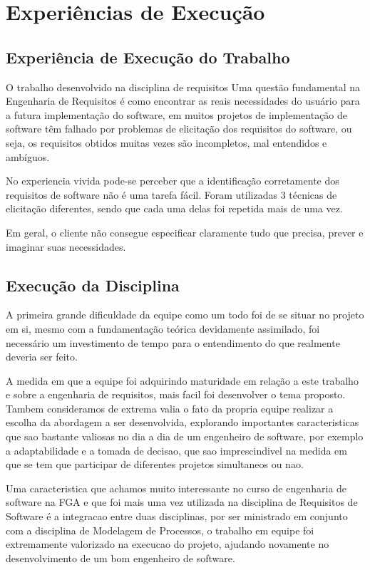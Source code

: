 \chapter[Experiências de Execução]{Experiências de Execução}

\section{Experiência de Execução do Trabalho}

O trabalho desenvolvido na disciplina de requisitos 
Uma questão fundamental na Engenharia de Requisitos é como encontrar as reais necessidades do usuário para a futura implementação do software, em muitos projetos de implementação de software têm falhado por problemas de elicitação dos requisitos do software, ou seja, os requisitos obtidos muitas vezes são incompletos, mal entendidos e ambíguos. 

No experiencia vivida pode-se perceber que a  identificação corretamente dos requisitos de software não é uma tarefa fácil. Foram utilizadas 3 técnicas de elicitação diferentes, sendo que cada uma delas foi repetida mais de uma vez.

Em geral, o cliente não consegue especificar claramente tudo que precisa, prever e imaginar suas necessidades.

\section{Execução da Disciplina}

A primeira grande dificuldade da equipe como um todo foi de se situar no projeto em si,
mesmo com a fundamentação teórica devidamente assimilado, foi necessário um investimento
de tempo para o entendimento do que realmente deveria ser feito.

A medida em que a equipe foi adquirindo maturidade em relação a este trabalho e sobre a
engenharia de requisitos, mais facil foi desenvolver o tema proposto. Tambem consideramos
de extrema valia o fato da propria equipe realizar a escolha da abordagem a ser desenvolvida,
explorando importantes caracteristicas que sao bastante valiosas no dia a dia de um engenheiro
de software, por exemplo a adaptabilidade e a tomada de decisao, que sao imprescindivel na
medida em que se tem que participar de diferentes projetos simultaneos ou nao.

Uma caracteristica que achamos muito interessante no curso de engenharia de software na
FGA e que foi mais uma vez utilizada na disciplina de Requisitos de Software é a integracao
entre duas disciplinas, por ser ministrado em conjunto com a disciplina de Modelagem de
Processos, o trabalho em equipe foi extremamente valorizado na execucao do projeto, ajudando
novamente no desenvolvimento de um bom engenheiro de software.

